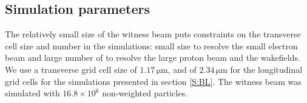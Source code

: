 \documentclass[aps,prstab,reprint,amsmath,amssymb,groupedaddress]{revtex4-1}
\newcommand{\unit}[1]{\,\mathrm{#1}}
\newcommand{\nexp}[1]{\times 10^{#1}}
\begin{document}


\subsection{Simulation parameters}\label{SIM}

The relatively small size of the witness beam %
puts constraints on the transverse cell size and number in the simulations: small size to resolve the small electron
beam and large number of to resolve the large proton beam and the wakefields.
We use %
a transverse grid cell size of $1.17\unit{\mu m}$, and of $2.34\unit{\mu m}$ for the longitudinal grid cells for the
simulations presented in section \ref{S:BL}. The witness beam was simulated with $16.8\nexp{6}$ non-weighted particles.
\end{document}
